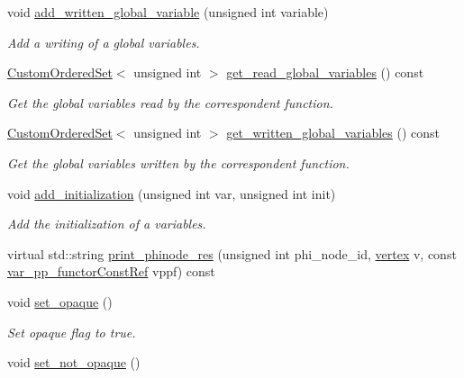 \begin{DoxyCompactItemize}
void \hyperlink{classBehavioralHelper_abcd96c178eb6529dd83d5b1b60a1f1cb}{add\+\_\+written\+\_\+global\+\_\+variable} (unsigned int variable)
\begin{DoxyCompactList}\small\item\em Add a writing of a global variables. \end{DoxyCompactList}\item 
\hyperlink{classCustomOrderedSet}{Custom\+Ordered\+Set}$<$ unsigned int $>$ \hyperlink{classBehavioralHelper_a646378cb2887db81dfd9a648cf911f56}{get\+\_\+read\+\_\+global\+\_\+variables} () const
\begin{DoxyCompactList}\small\item\em Get the global variables read by the correspondent function. \end{DoxyCompactList}\item 
\hyperlink{classCustomOrderedSet}{Custom\+Ordered\+Set}$<$ unsigned int $>$ \hyperlink{classBehavioralHelper_a1e19a50936f2a778d5bf785a78be2054}{get\+\_\+written\+\_\+global\+\_\+variables} () const
\begin{DoxyCompactList}\small\item\em Get the global variables written by the correspondent function. \end{DoxyCompactList}\item 
void \hyperlink{classBehavioralHelper_a737aa57d194070c6bac90beff6e299e6}{add\+\_\+initialization} (unsigned int var, unsigned int init)
\begin{DoxyCompactList}\small\item\em Add the initialization of a variables. \end{DoxyCompactList}\item 
virtual std\+::string \hyperlink{classBehavioralHelper_add86ad429c5bcbc95fc8a294b0fb8174}{print\+\_\+phinode\+\_\+res} (unsigned int phi\+\_\+node\+\_\+id, \hyperlink{graph_8hpp_abefdcf0544e601805af44eca032cca14}{vertex} v, const \hyperlink{var__pp__functor_8hpp_a8a6b51b6519401d911398943510557f0}{var\+\_\+pp\+\_\+functor\+Const\+Ref} vppf) const
\item 
void \hyperlink{classBehavioralHelper_acb52613a750173a27607e9575cc92924}{set\+\_\+opaque} ()
\begin{DoxyCompactList}\small\item\em Set opaque flag to true. \end{DoxyCompactList}\item 
void \hyperlink{classBehavioralHelper_a7cfbf77adc6744fcb84150a99a98b2ee}{set\+\_\+not\+\_\+opaque} ()

\end{DoxyCompactItemize}
